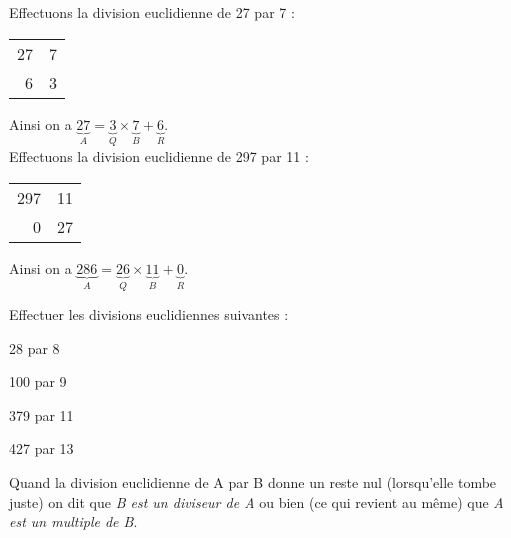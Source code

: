 \begin{exemple}[s]
	Effectuons la division euclidienne de 27 par 7 :
	\begin{center}
		\begin{tabular}{r|l}
			27 & 7 \\
			\cline{2-2}
			6  & 3
		\end{tabular}
	\end{center}
	Ainsi on a $\displaystyle\underbrace{27}_{A}=\underbrace{3}_{Q}\times \underbrace{7}_{B}+\underbrace{6}_{R}$.\\[3em]
	
	Effectuons la division euclidienne de 297 par 11 :
	\begin{center}
		\begin{tabular}{r|l}
			297 & 11 \\
			\cline{2-2}
			0   & 27
		\end{tabular}
	\end{center}
	Ainsi on a $\displaystyle\underbrace{286}_{A}=\underbrace{26}_{Q}\times \underbrace{11}_{B}+\underbrace{0}_{R}$.
\end{exemple}

\begin{exercice}[]
	Effectuer les divisions euclidiennes suivantes :
	\begin{multicols}{4}
		\begin{enumalph}
			\item 	28 par 8
			\item 	100 par 9
			\item 	379 par 11
			\item 	427 par 13\\
		\end{enumalph}
	\end{multicols}
\end{exercice}



\begin{definition}
	Quand la division euclidienne de A par B donne un reste nul (lorsqu'elle tombe juste) on dit que \emph{B est un diviseur de A} ou bien (ce qui revient au même) que \emph{A est un multiple de B}.
\end{definition}

